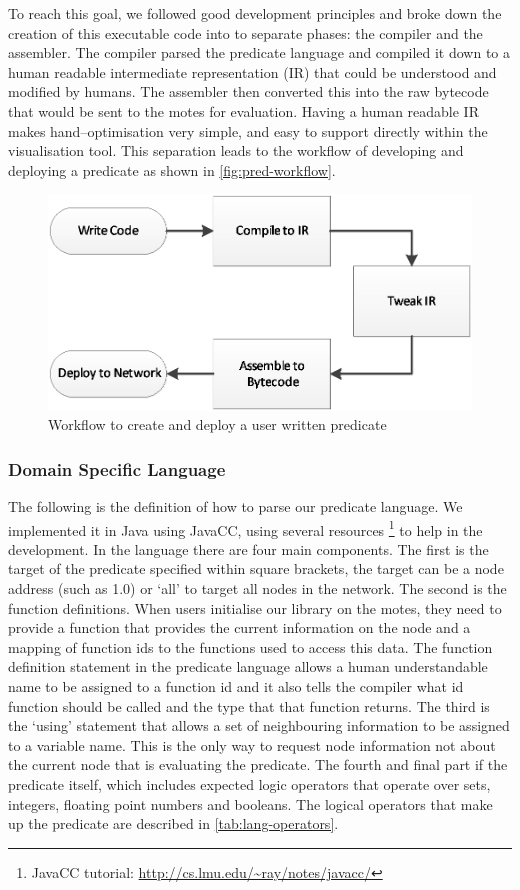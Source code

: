 To reach this goal, we followed good development principles and broke down the creation of this executable code into to separate phases: the compiler and the assembler. The compiler parsed the predicate language and compiled it down to a human readable intermediate representation (IR) that could be understood and modified by humans. The assembler then converted this into the raw bytecode that would be sent to the motes for evaluation. Having a human readable IR makes hand--optimisation very simple, and easy to support directly within the visualisation tool. This separation leads to the workflow of developing and deploying a predicate as shown in \autoref{fig:pred-workflow}.

\begin{figure}[H]
\centering
\includegraphics{Diagrams/predicate-dev-process.eps}
\caption{Workflow to create and deploy a user written predicate}
\label{fig:pred-workflow}
\end{figure}


\subsubsection{Domain Specific Language}

The following is the definition of how to parse our predicate language. We implemented it in Java using JavaCC, using several resources \footnote{JavaCC tutorial: \url{http://cs.lmu.edu/~ray/notes/javacc/}} to help in the development. In the language there are four main components. The first is the target of the predicate specified within square brackets, the target can be a node address (such as 1.0) or `all' to target all nodes in the network. The second is the function definitions. When users initialise our library on the motes, they need to provide a function that provides the current information on the node and a mapping of function ids to the functions used to access this data. The function definition statement in the predicate language allows a human understandable name to be assigned to a function id and it also tells the compiler what id function should be called and the type that that function returns. The third is the `using' statement that allows a set of neighbouring information to be assigned to a variable name. This is the only way to request node information not about the current node that is evaluating the predicate. The fourth and final part if the predicate itself, which includes expected logic operators that operate over sets, integers, floating point numbers and booleans. The logical operators that make up the predicate are described in \autoref{tab:lang-operators}.


